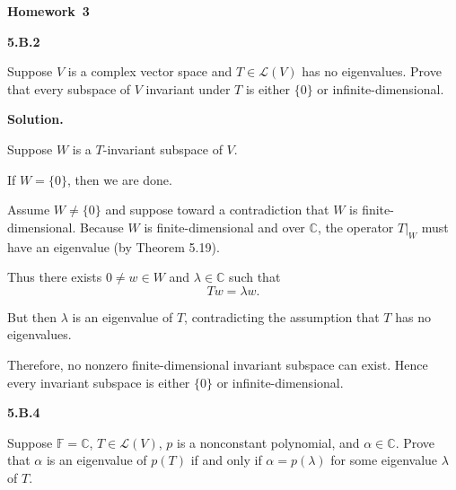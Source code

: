 \documentclass[11pt]{article}
\newcommand{\AssignmentType}{Homework} %
\newcommand{\AssignmentNumber}{3}
\newcommand{\ProblemDivider}[1]{%
  \vspace{1.0em}
  \noindent\textbf{#1}\par
  \vspace{0.35em}
}
\newcommand{\ProblemAnnounce}{\noindent}
\newcommand{\SolutionAnnounce}{\noindent\textbf{Solution.}\par\medskip}
\begin{document}
\begin{center}
  {\Large \textbf{\AssignmentType~\AssignmentNumber}}
\end{center}
\vspace{0.75em}


\ProblemDivider{5.B.2}

\begin{problemBox}
\ProblemAnnounce
Suppose $V$ is a complex vector space and $T \in \mathcal{L}(V)$ has no eigenvalues.
Prove that every subspace of $V$ invariant under $T$ is either $\{0\}$ or infinite-dimensional.
\end{problemBox}

\begin{solutionBox}
\SolutionAnnounce
\doublespacing

Suppose $W$ is a $T$-invariant subspace of $V$.

If $W = \{0\}$, then we are done.

Assume $W \neq \{0\}$ and suppose toward a contradiction that $W$ is finite-dimensional.
Because $W$ is finite-dimensional and over $\mathbb{C}$, the operator
$T|_W$ must have an eigenvalue (by Theorem 5.19).

Thus there exists $0 \neq w \in W$ and $\lambda \in \mathbb{C}$ such that
\[
T w = \lambda w.
\]

But then $\lambda$ is an eigenvalue of $T$, contradicting the assumption
that $T$ has no eigenvalues.

Therefore, no nonzero finite-dimensional invariant subspace can exist.
Hence every invariant subspace is either $\{0\}$ or infinite-dimensional.

\end{solutionBox}

\ProblemDivider{5.B.4}

\begin{problemBox}
\ProblemAnnounce
Suppose $\mathbb{F}=\mathbb{C}$, $T\in\mathcal{L}(V)$, $p$ is a nonconstant polynomial,
and $\alpha\in\mathbb{C}$. Prove that $\alpha$ is an eigenvalue of $p(T)$
if and only if $\alpha=p(\lambda)$ for some eigenvalue $\lambda$ of $T$.
\end{problemBox}
\end{document}
